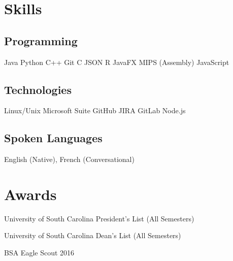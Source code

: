 \documentclass[letterpaper]{deedy-resume}
\begin{document}
\begin{minipage}[t]{0.29\textwidth}
\sectionspace

\section{Skills}

\subsection{Programming}
Java \textbullet{} Python \textbullet{} C++ \textbullet{} Git \textbullet{} C \textbullet{} JSON  R \textbullet{} JavaFX \textbullet{} MIPS (Assembly) \textbullet{} JavaScript
\sectionspace

\subsection{Technologies}
Linux/Unix \textbullet{} Microsoft Suite \textbullet{} GitHub JIRA \textbullet{} GitLab \textbullet{}Node.js 
\sectionspace 

\subsection{Spoken Languages}
English (Native), French (Conversational)


\sectionspace

\section{Awards}
\vspace{0.2cm}
\setlength{\leftmargini}{1em}
\begin{tightitemize}
\item University of South Carolina President's List (All Semesters)
\item University of South Carolina Dean's List (All Semesters)
\item BSA Eagle Scout 2016
\end{tightitemize}


\sectionspace


\sectionspace 

\end{minipage} 
\hfill
%
%
\end{document}
